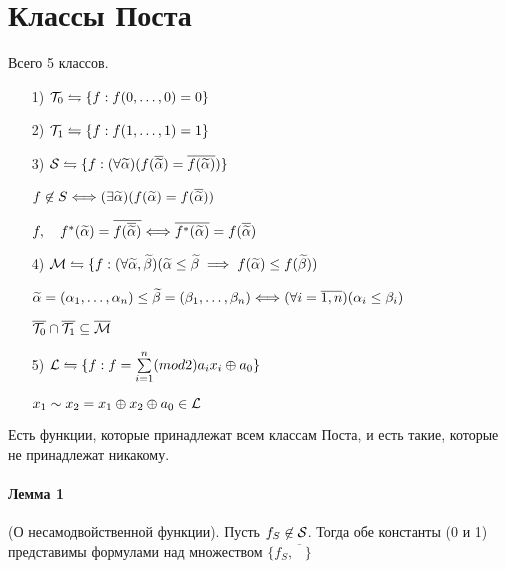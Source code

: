 

\title{}
\author{Козырнов Александр Дмитриевич, ИУ7-32Б}
\date{\today}


\section{Классы Поста}
Всего 5 классов.

\begin{itemize}
    \item[1)] ${\cal T}_0 \leftrightharpoons \{f: f(0,\ldots,0) = 0\} $ 
    \item[2)] ${\cal T}_1 \leftrightharpoons \{f: f(1,\ldots,1) = 1\}$
    \item[3)] ${\cal S} \leftrightharpoons \{f: (\forall \widetilde{\alpha})
        (f(\overline{\widetilde{\alpha}}) = \overline{f(\widetilde{\alpha})})\} $

$f \not\in S \Longleftrightarrow (\exists \widetilde{\alpha})(f(\widetilde{\alpha}) = f(\overline{\widetilde{\alpha}}))$ 

$f, \quad f^{*}(\widetilde{\alpha}) = \overline{f(\overline{\widetilde{\alpha}})} \Longleftrightarrow
\overline{f^{*}(\widetilde{\alpha})} = f(\overline{\widetilde{\alpha}})$

    \item[4)] ${\cal M} \leftrightharpoons \{f: (\forall \widetilde{\alpha}, \widetilde{\beta})(\widetilde{\alpha} \le \widetilde{\beta}
            \implies f(\widetilde{\alpha}) \le f(\widetilde{\beta}))$

            $\widetilde{\alpha} = (\alpha_1, \ldots, \alpha_n) \le \widetilde{\beta} =
            (\beta_1, \ldots, \beta_n) \Longleftrightarrow
            (\forall i = \overline{1,n})(\alpha_i \le \beta_i)$
            
        $\overline{{\cal T}_0} \cap \overline{{\cal T}_1} \subseteq \overline{{\cal M}}$ 

    \item[5)] ${\cal L} \leftrightharpoons \{f: 
        f = \sum\limits_{i=1}^{n} (mod2)a_ix_i \oplus a_0\} $ 

        $x_1 \sim x_2 = x_1 \oplus x_2 \oplus a_0 \in {\cal L}$
\end{itemize}

Есть функции, которые принадлежат всем классам Поста, и есть такие, которые не принадлежат никакому.

\medskip

\paragraph*{Лемма 1} (О несамодвойственной функции).
Пусть $f_S \not\in {\cal S}$. Тогда обе константы (0 и 1) представимы формулами
над множеством $\{f_S, \overline{\phantom{A}}\} $ 

